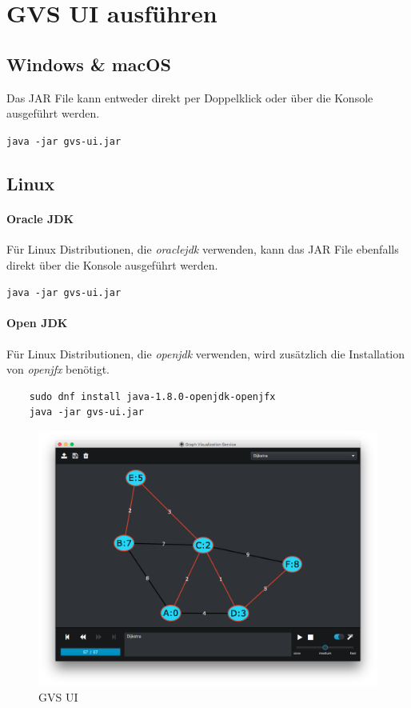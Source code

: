 \documentclass[11pt,a4paper,english,oneside]{book}
\numberwithin{equation}{chapter}
\begin{document}
	\section{GVS UI ausführen}
	\subsection{Windows \& macOS}
	Das JAR File kann entweder direkt per Doppelklick oder über die Konsole ausgeführt werden.
	
	\lstinline{java -jar gvs-ui.jar}
	
	\subsection{Linux}
	\paragraph{Oracle JDK}
	Für Linux Distributionen, die \textit{oraclejdk} verwenden, kann das JAR File ebenfalls direkt über die Konsole ausgeführt werden.
	
	\lstinline{java -jar gvs-ui.jar}
	
	\paragraph{Open JDK}
	Für Linux Distributionen, die \textit{openjdk} verwenden, wird zusätzlich die Installation von \textit{openjfx} benötigt.
	
	\begin{lstlisting}
	sudo dnf install java-1.8.0-openjdk-openjfx
	java -jar gvs-ui.jar
	\end{lstlisting}
	
	\begin{figure}[h!]
		\centering
		\includegraphics[width=0.7\linewidth]{assets/images/gvs-ui}
		\caption{GVS UI}
		\label{fig:gvs-ui}
	\end{figure}
\end{document}
